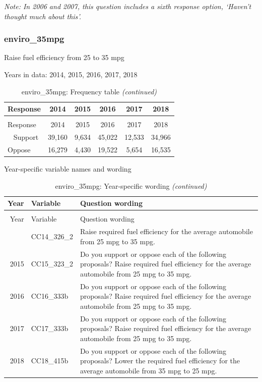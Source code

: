 \documentclass[12pt]{article}
\begin{document}
\emph{Note: In 2006 and 2007, this question includes a sixth response
option, `Haven't thought much about this'.}

\subsubsection{enviro\_35mpg}\label{enviro_35mpg}

Raise fuel efficiency from 25 to 35 mpg

Years in data: 2014, 2015, 2016, 2017,
2018\begingroup\fontsize{10}{12}\selectfont

\begin{longtable}[t]{lccccc}
\caption{\label{tab:unnamed-chunk-4}enviro\_35mpg: Frequency table}\\
\toprule
Response & 2014 & 2015 & 2016 & 2017 & 2018\\
\midrule
\endfirsthead
\caption[]{enviro\_35mpg: Frequency table \textit{(continued)}}\\
\toprule
Response & 2014 & 2015 & 2016 & 2017 & 2018\\
\midrule
\endhead
\
\endfoot
\bottomrule
\endlastfoot
Support & 39,160 & 9,634 & 45,022 & 12,533 & 34,966\\
Oppose & 16,279 & 4,430 & 19,522 & 5,654 & 16,535\\*
\end{longtable}

\endgroup{}

Year-specific variable names and wording

\begin{longtable}[t]{rl>{\raggedright\arraybackslash}p{10cm}}
\caption{\label{tab:unnamed-chunk-4}enviro\_35mpg: Year-specific wording}\\
\toprule
Year & Variable & Question wording\\
\midrule
\endfirsthead
\caption[]{enviro\_35mpg: Year-specific wording \textit{(continued)}}\\
\toprule
Year & Variable & Question wording\\
\midrule
\endhead
\
\endfoot
\bottomrule
\endlastfoot
2014 & CC14\_326\_2 & Raise required fuel efficiency for the average automobile from 25 mpg to 35 mpg.\\
2015 & CC15\_323\_2 & Do you support or oppose each of the following proposals? Raise required fuel efficiency for the average automobile from 25 mpg to 35 mpg.\\
2016 & CC16\_333b & Do you support or oppose each of the following proposals? Raise required fuel efficiency for the average automobile from 25 mpg to 35 mpg.\\
2017 & CC17\_333b & Do you support or oppose each of the following proposals? Raise required fuel efficiency for the average automobile from 25 mpg to 35 mpg.\\
2018 & CC18\_415b & Do you support or oppose each of the following proposals? Lower the required fuel efficiency for the average automobile from 35 mpg to 25 mpg.\\*
\end{longtable}
\end{document}
